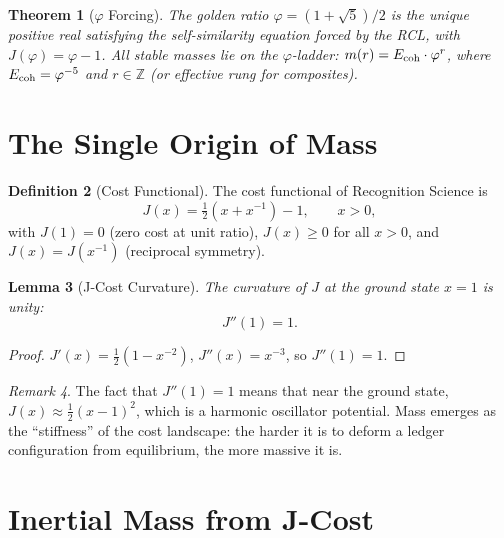 \documentclass[12pt,a4paper]{article}
\newtheorem{theorem}{Theorem}[section]
\newtheorem{lemma}[theorem]{Lemma}
\theoremstyle{definition}
\newtheorem{definition}[theorem]{Definition}
\theoremstyle{remark}
\newtheorem{remark}[theorem]{Remark}
\begin{document}
\begin{theorem}[$\varphi$ Forcing]
\label{thm:phi_forcing}
The golden ratio $\varphi = (1+\sqrt{5})/2$ is the unique positive real
satisfying the self-similarity equation forced by the RCL, with
$J(\varphi) = \varphi - 1$.  All stable masses lie on the
$\varphi$-ladder: $m(r) = E_{\rm coh}\cdot\varphi^r$, where
$E_{\rm coh} = \varphi^{-5}$ and $r \in \mathbb{Z}$ (or effective rung
for composites).
\end{theorem}

\section{The Single Origin of Mass}
\label{sec:origin}

\begin{definition}[Cost Functional]
\label{def:J}
The cost functional of Recognition Science is
\begin{equation}
  J(x) = \tfrac{1}{2}(x + x^{-1}) - 1, \qquad x > 0,
\end{equation}
with $J(1) = 0$ (zero cost at unit ratio), $J(x) \geq 0$
for all $x > 0$, and $J(x) = J(x^{-1})$ (reciprocal
symmetry).
\end{definition}

\begin{lemma}[J-Cost Curvature]
\label{lem:curv}
The curvature of $J$ at the ground state $x = 1$ is unity:
\begin{equation}
  J''(1) = 1.
\end{equation}
\end{lemma}

\begin{proof}
$J'(x) = \tfrac{1}{2}(1 - x^{-2})$,
$J''(x) = x^{-3}$, so $J''(1) = 1$.
\end{proof}

\begin{remark}
The fact that $J''(1) = 1$ means that near the ground state,
$J(x) \approx \tfrac{1}{2}(x - 1)^2$, which is a harmonic
oscillator potential.  Mass emerges as the ``stiffness'' of
the cost landscape: the harder it is to deform a ledger
configuration from equilibrium, the more massive it is.
\end{remark}

\section{Inertial Mass from J-Cost}
\label{sec:inertial}
\end{document}
